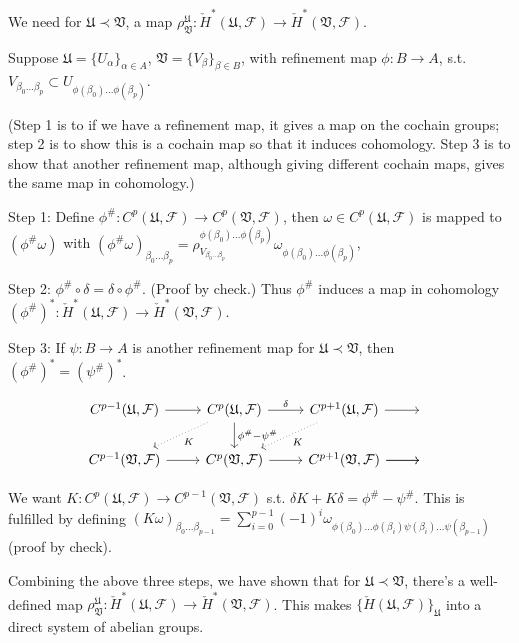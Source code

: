 \documentclass{article}
\theoremstyle{mystyle}
\theoremstyle{remark}
\numberwithin{equation}{section}
\begin{document}
We need for $\mathfrak{U}\prec \mathfrak{V}$, a map $\rho^{\mathfrak{U}}_{\mathfrak{V}}\colon \check{H}^*(\mathfrak{U},\mathcal{F})\rightarrow\check{H}^*(\mathfrak{V},\mathcal{F})$. 

Suppose $\mathfrak{U} = \{U_\alpha\}_{\alpha \in A}$, $\mathfrak{V} = \{V_\beta\}_{\beta \in B}$, with refinement map $\phi\colon B\rightarrow A$, s.t. $V_{\beta_0...\beta_p} \subset U_{\phi(\beta_0)...\phi(\beta_p)}$. 

(Step 1 is to if we have a refinement map, it gives a map on the cochain groups; step 2 is to show this is a cochain map so that it induces cohomology. Step 3 is to show that another refinement map, although giving different cochain maps, gives the same map in cohomology.)

Step 1: Define $\phi^\#\colon C^p(\mathfrak{U},\mathcal{F})\rightarrow C^p(\mathfrak{V},\mathcal{F})$, then $\omega  \in C^p(\mathfrak{U},\mathcal{F})$ is mapped to $(\phi^\#\omega)$ with $(\phi^\#\omega)_{\beta_0...\beta_p} = \rho_{V_{\beta_0...\beta_p}}^{\phi(\beta_0)...\phi(\beta_p)}\omega_{\phi(\beta_0)...\phi(\beta_p)}$, 

Step 2: $\phi^\#\circ \delta = \delta \circ \phi^\#$. (Proof by check.) Thus $\phi^\#$ induces a map in cohomology $(\phi^\#)^*\colon \check{H}^*(\mathfrak{U},\mathcal{F})\rightarrow\check{H}^*(\mathfrak{V},\mathcal{F})$. 

Step 3: If $\psi\colon B\rightarrow A$ is another refinement map for $\mathfrak{U}\prec \mathfrak{V}$, then $(\phi^\#)^*=(\psi^\#)^*$. 

$$
\begin{tikzcd}
C^{p-1}(\mathfrak{U},\mathcal{F})\ar[r]&
C^p(\mathfrak{U},\mathcal{F})\ar[r,"\delta"] \ar[ld,dotted,"K"] \ar[d,"{\phi^\#-\psi^\#}"]&
C^{p+1}(\mathfrak{U},\mathcal{F})\ar[r] \ar[ld,dotted, "K"]&~\\
C^{p-1}(\mathfrak{V},\mathcal{F})\ar[r]&
C^p(\mathfrak{V},\mathcal{F})\ar[r]&
C^{p+1}(\mathfrak{V},\mathcal{F})\ar[r]\ar[r]&~
\end{tikzcd}
$$

We want $K\colon C^p(\mathfrak{U},\mathcal{F}) \rightarrow 
C^{p-1}(\mathfrak{V},\mathcal{F})$ s.t. $\delta K + K\delta = \phi^\#-\psi^\#$. This is fulfilled by defining $(K\omega)_{\beta_0...\beta_{p-1}} = \sum_{i=0}^{p-1}(-1)^i \omega_{\phi(\beta_0)...\phi(\beta_i)\psi(\beta_i)...\psi(\beta_{p-1})}$ (proof by check).

Combining the above three steps, we have shown that for $\mathfrak{U}\prec \mathfrak{V}$, there's a well-defined map $\rho^{\mathfrak{U}}_{\mathfrak{V}}\colon \check{H}^*(\mathfrak{U},\mathcal{F})\rightarrow\check{H}^*(\mathfrak{V},\mathcal{F})$. This makes $\{\check{H}(\mathfrak{U},\mathcal{F})\}_{\mathfrak{U}}$ into a direct system of abelian groups.
\end{document}
